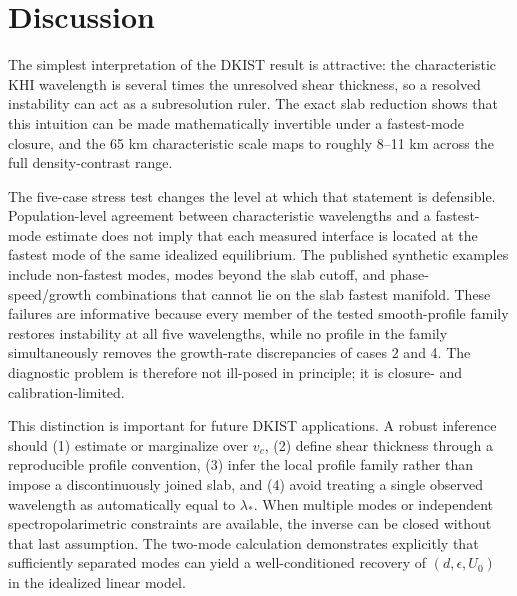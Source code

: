 \documentclass[linenumbers]{aastex7}
\begin{document}
\section{Discussion}
The simplest interpretation of the DKIST result is attractive: the characteristic KHI wavelength is several times the unresolved shear thickness, so a resolved instability can act as a subresolution ruler. The exact slab reduction shows that this intuition can be made mathematically invertible under a fastest-mode closure, and the 65 km characteristic scale maps to roughly 8--11 km across the full density-contrast range.

The five-case stress test changes the level at which that statement is defensible. Population-level agreement between characteristic wavelengths and a fastest-mode estimate does not imply that each measured interface is located at the fastest mode of the same idealized equilibrium. The published synthetic examples include non-fastest modes, modes beyond the slab cutoff, and phase-speed/growth combinations that cannot lie on the slab fastest manifold. These failures are informative because every member of the tested smooth-profile family restores instability at all five wavelengths, while no profile in the family simultaneously removes the growth-rate discrepancies of cases 2 and 4. The diagnostic problem is therefore not ill-posed in principle; it is closure- and calibration-limited.

This distinction is important for future DKIST applications. A robust inference should (1) estimate or marginalize over $v_c$, (2) define shear thickness through a reproducible profile convention, (3) infer the local profile family rather than impose a discontinuously joined slab, and (4) avoid treating a single observed wavelength as automatically equal to $\lambda_\ast$. When multiple modes or independent spectropolarimetric constraints are available, the inverse can be closed without that last assumption. The two-mode calculation demonstrates explicitly that sufficiently separated modes can yield a well-conditioned recovery of $(d,\epsilon,U_0)$ in the idealized linear model.
\end{document}

